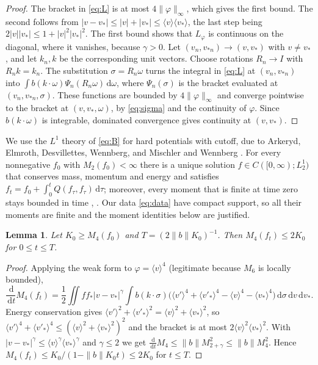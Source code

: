 \documentclass[11pt]{amsart}
\newtheorem{lemma}[theorem]{Lemma}
\theoremstyle{definition}
\newcommand{\dd}{\,\mathrm{d}}
\newcommand{\jb}[1]{\langle #1\rangle}
\newcommand{\nb}{\|b\|}
\begin{document}
\begin{proof}
The bracket in \eqref{eq:L} is at most $4\|\varphi\|_\infty$, which gives the first bound. The second follows from $|v-v_*|\le|v|+|v_*|\le\jb{v}\jb{v_*}$, the last step being $2|v||v_*|\le1+|v|^2|v_*|^2$. The first bound shows that $L_\varphi$ is continuous on the diagonal, where it vanishes, because $\gamma>0$. Let $(v_n,v_{*n})\to(v,v_*)$ with $v\ne v_*$, and let $k_n,k$ be the corresponding unit vectors. Choose rotations $R_n\to I$ with $R_nk=k_n$. The substitution $\sigma=R_n\omega$ turns the integral in \eqref{eq:L} at $(v_n,v_{*n})$ into $\int b(k\cdot\omega)\Psi_n(R_n\omega)\dd\omega$, where $\Psi_n(\sigma)$ is the bracket evaluated at $(v_n,v_{*n},\sigma)$. These functions are bounded by $4\|\varphi\|_\infty$ and converge pointwise to the bracket at $(v,v_*,\omega)$, by \eqref{eq:sigma} and the continuity of $\varphi$. Since $b(k\cdot\omega)$ is integrable, dominated convergence gives continuity at $(v,v_*)$.
\end{proof}

We use the $L^1$ theory of \eqref{eq:B} for hard potentials with cutoff, due to Arkeryd, Elmroth, Desvillettes, Wennberg, and Mischler and Wennberg \cite{MW99,Wen97}. For every nonnegative $f_0$ with $M_2(f_0)<\infty$ there is a unique solution $f\in C([0,\infty);L^1_2)$ that conserves mass, momentum and energy and satisfies $f_t=f_0+\int_0^tQ(f_\tau,f_\tau)\dd\tau$; moreover, every moment that is finite at time zero stays bounded in time \cite[Sect.~1]{MW99}, \cite{Wen97}. Our data \eqref{eq:data} have compact support, so all their moments are finite and the moment identities below are justified.

\begin{lemma}\label{lem:moments}
Let $K_0\ge M_4(f_0)$ and $T=(2\nb K_0)^{-1}$. Then $M_4(f_t)\le 2K_0$ for $0\le t\le T$.
\end{lemma}

\begin{proof}
Applying the weak form to $\varphi=\jb{v}^4$ (legitimate because $M_6$ is locally bounded),
\[
\frac{\dd}{\dd t}M_4(f_t)=\frac12\iint f f_*|v-v_*|^\gamma\int b(k\cdot\sigma)\big(\jb{v'}^4+\jb{v'_*}^4-\jb{v}^4-\jb{v_*}^4\big)\dd\sigma\dd v\dd v_* .
\]
Energy conservation gives $\jb{v'}^2+\jb{v'_*}^2=\jb{v}^2+\jb{v_*}^2$, so $\jb{v'}^4+\jb{v'_*}^4\le(\jb{v}^2+\jb{v_*}^2)^2$ and the bracket is at most $2\jb{v}^2\jb{v_*}^2$. With $|v-v_*|^\gamma\le\jb{v}^\gamma\jb{v_*}^\gamma$ and $\gamma\le2$ we get $\frac{\dd}{\dd t}M_4\le\nb M_{2+\gamma}^2\le\nb M_4^2$. Hence $M_4(f_t)\le K_0/(1-\nb K_0t)\le2K_0$ for $t\le T$.
\end{proof}
\end{document}
